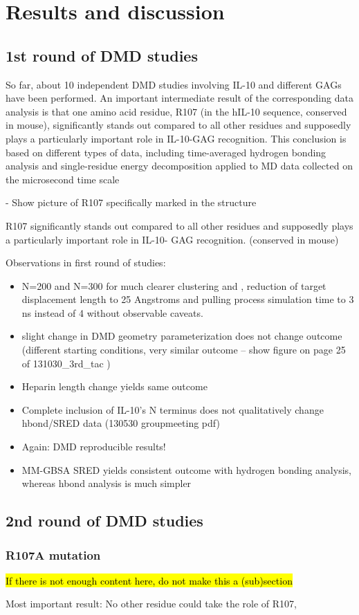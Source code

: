 \section{Results and discussion}

\subsection{1st round of DMD studies}



So far, about 10 independent DMD studies involving IL-10 and different GAGs have
been performed. An important intermediate result of the corresponding data analysis
is that one amino acid residue, R107 (in the hIL-10 sequence, conserved in mouse), significantly
stands out compared to all other residues and supposedly plays a particularly
important role in IL-10-GAG recognition. This conclusion is based on different types
of data, including time-averaged hydrogen bonding analysis and single-residue energy
decomposition applied to MD data collected on the microsecond time scale

- Show picture of R107 specifically marked in the structure


R107 significantly stands out compared to all other residues
and supposedly plays a particularly important role in IL-10-
GAG recognition.
(conserved in mouse)

Observations in first round of studies:

\begin{itemize}

\item N=200 and N=300 for much clearer clustering and , reduction of target displacement length
to 25  Angstroms and pulling process simulation time to 3 ns instead of 4 without
observable caveats.

\item slight change in DMD geometry parameterization does not change outcome (different starting conditions, very similar outcome -- show figure on page 25 of 131030_3rd_tac )

\item Heparin length change yields same outcome

\item Complete inclusion of IL-10's N terminus does not qualitatively change hbond/SRED data (130530 groupmeeting pdf)

\item Again: DMD reproducible results!

\item MM-GBSA SRED yields consistent outcome with hydrogen bonding analysis,
whereas hbond analysis is much simpler


\end{itemize}

\subsection{2nd round of DMD studies}

\subsubsection{R107A mutation}

\hl{If there is not enough content here, do not make this a (sub)section}

Most important result: No other residue could take the role of R107,

